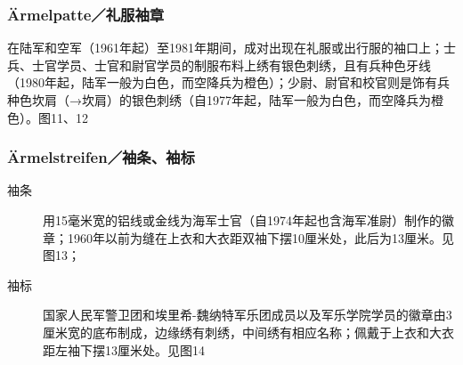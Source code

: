 \subsubsection*{Ärmelpatte／礼服袖章}

在陆军和空军（1961年起）至1981年期间，成对出现在礼服或出行服的袖口上；士兵、士官学员、士官和尉官学员的制服布料上绣有银色刺绣，且有兵种色牙线（1980年起，陆军一般为白色，而空降兵为橙色）；少尉、尉官和校官则是饰有兵种色坎肩（→坎肩）的银色刺绣（自1977年起，陆军一般为白色，而空降兵为橙色）。图11、12

\subsubsection*{Ärmelstreifen／袖条、袖标}

\begin{description}

    \item[袖条] 用15毫米宽的铝线或金线为海军士官（自1974年起也含海军准尉）制作的徽章；1960年以前为缝在上衣和大衣距双袖下摆10厘米处，此后为13厘米。见图13；

    \item[袖标] 国家人民军警卫团和埃里希-魏纳特军乐团成员以及军乐学院学员的徽章由3厘米宽的底布制成，边缘绣有刺绣，中间绣有相应名称；佩戴于上衣和大衣距左袖下摆13厘米处。见图14

\end{description}


